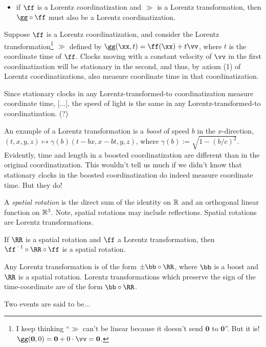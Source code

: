 \documentclass{article}
\begin{document}
\begin{itemize}
    \item if $\ff$ is a Lorentz coordinatization and $\gg$ is a Lorentz transformation, then $\gg \circ \ff$ must also be a Lorentz coordinatization.
\end{itemize}

Suppose $\ff$ is a Lorentz coordinatization, and consider the Lorentz transformation\footnote{I keep thinking ``$\gg$ can't be linear because it doesn't send $\mathbf{0}$ to $\mathbf{0}$''. But it is! $\gg(\mathbf{0}, 0) = \mathbf{0} + 0 \cdot \vv = \mathbf{0}$.} $\gg$ defined by ${\gg(\xx, t) = \ff(\xx) + t \vv}$, where $t$ is the coordinate time of $\ff$. Clocks moving with a constant velocity of $\vv$ in the first coordinatization will be stationary in the second, and thus, by axiom (1) of Lorentz coordinatizations, also measure coordinate time in that coordinatization.

Since stationary clocks in any Lorentz-transformed-to coordinatization measure coordinate time, [...], the speed of light is the same in any Lorentz-transformed-to coordinatization. (?)

\vspace{.5cm}

An example of a Lorentz transformation is a \textit{boost} of speed $b$ in the $x$-direction, ${(t, x, y, z) \mapsto \gamma(b)(t - bx, x - bt, y, z)}$, where $\gamma(b) := \sqrt{1 - (b/c)^2}$. Evidently, time and length in a boosted coordinatization are different than in the original coordinatization. This wouldn't tell us much if we didn't know that stationary clocks in the boosted coordinatization do indeed measure coordinate time. But they do!

A \textit{spatial rotation} is the direct sum of the identity on $\mathbb{R}$ and an orthogonal linear function on $\mathbb{R}^3$. Note, spatial rotations may include reflections. Spatial rotations are Lorentz transformations. 

If $\RR$ is a spatial rotation and $\ff$ a Lorentz transformation, then $\ff^{-1} \circ \RR \circ \ff$ is a spatial rotation.

Any Lorentz transformation is of the form $\pm \bb \circ \RR$, where $\bb$ is a boost and $\RR$ is a spatial rotation. Lorentz transformations which preserve the sign of the time-coordinate are of the form $\bb \circ \RR$.

\vspace{.5cm}

Two events are said to be...
\end{document}
